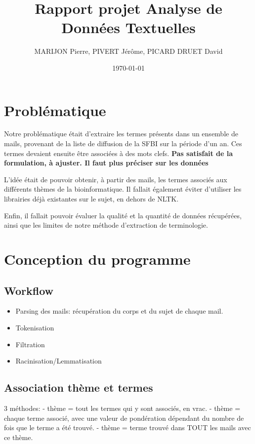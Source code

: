 \documentclass[11pt,a4paper]{article}
\author{MARIJON Pierre, PIVERT Jérôme, PICARD DRUET David}
\title{Rapport projet Analyse de Données Textuelles}
\date{\today}
\begin{document}
\maketitle

\section*{Problématique}
Notre problématique était d'extraire les termes présents dans un ensemble de mails, provenant de la liste de diffusion de la SFBI sur la période d'un an. Ces termes devaient ensuite être associées à des mots clefs. \textbf{Pas satisfait de la formulation, à ajuster. Il faut plus préciser sur les données}

L'idée était de pouvoir obtenir, à partir des mails, les termes associés aux différents thèmes de la bioinformatique. Il fallait également éviter d'utiliser les librairies déjà existantes sur le sujet, en dehors de NLTK.

Enfin, il fallait pouvoir évaluer la qualité et la quantité de données récupérées, ainsi que les limites de notre méthode d'extraction de terminologie.


\section*{Conception du programme}
\subsection*{Workflow}
\begin{itemize}
    \item Parsing des mails: récupération du corps et du sujet de chaque mail.
    \item Tokenisation
    \item Filtration
    \item Racinisation/Lemmatisation
\end{itemize}

\subsection*{Association thème et termes}
3 méthodes:
- thème = tout les termes qui y sont associés, en vrac.
- thème = chaque terme associé, avec une valeur de pondération dépendant du nombre de fois que le terme a été trouvé.
- thème = terme trouvé dans TOUT les mails avec ce thème.
\end{document}
